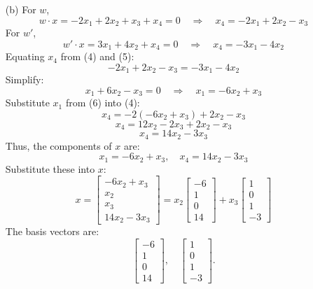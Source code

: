 \begin{enumerate}
\item[(b)] For \(w\),
\[
w \cdot x = -2x_1 + 2x_2 + x_3 + x_4 = 0 \quad \Rightarrow \quad x_4 = -2x_1 + 2x_2 - x_3 \tag{4}
\]
For \(w'\),
\[
w' \cdot x = 3x_1 + 4x_2 + x_4 = 0 \quad \Rightarrow \quad x_4 = -3x_1 - 4x_2 \tag{5}
\]
Equating \(x_4\) from (4) and (5):
\[
-2x_1 + 2x_2 - x_3 = -3x_1 - 4x_2
\]
Simplify:
\[
x_1 + 6x_2 - x_3 = 0 \quad \Rightarrow \quad x_1 = -6x_2 + x_3 \tag{6}
\]
Substitute \(x_1\) from (6) into (4):
\[
x_4 = -2(-6x_2 + x_3) + 2x_2 - x_3
\]
\[
x_4 = 12x_2 - 2x_3 + 2x_2 - x_3
\]
\[
x_4 = 14x_2 - 3x_3 \tag{7}
\]
Thus, the components of \(x\) are:
\[
x_1 = -6x_2 + x_3, \quad x_4 = 14x_2 - 3x_3
\]
Substitute these into \(x\):
\[
x =
\begin{bmatrix}
-6x_2 + x_3 \\
x_2 \\
x_3 \\
14x_2 - 3x_3
\end{bmatrix}
= x_2
\begin{bmatrix}
-6 \\
1 \\
0 \\
14
\end{bmatrix}
+ x_3
\begin{bmatrix}
1 \\
0 \\
1 \\
-3
\end{bmatrix}
\]
The basis vectors are:
\[
\begin{bmatrix}
-6 \\
1 \\
0 \\
14
\end{bmatrix}, \quad
\begin{bmatrix}
1 \\
0 \\
1 \\
-3
\end{bmatrix}.
\]

\end{enumerate}